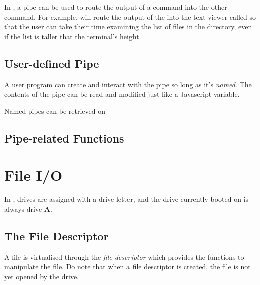 In \thedos, a pipe can be used to route the output of a command into the other command. For example,  will route the output of the  into the text viewer called  so that the user can take their time examining the list of files in the directory, even if the list is taller that the terminal's height.

\section{User-defined Pipe}

A user program can create and interact with the pipe so long as it's \emph{named}. The contents of the pipe can be read and modified just like a Javascript variable.

Named pipes can be retrieved on 

\section{Pipe-related Functions}

\begin{outline}
\1
\1
\1
\1
\1
\1
\end{outline}


\chapter{File I/O}
In \thedos, drives are assigned with a drive letter, and the drive currently booted on is always drive \textbf{A}.


\section{The File Descriptor}
A file is virtualised through the \emph{file descriptor} which provides the functions to manipulate the file. Do note that when a file descriptor is created, the file is not yet opened by the drive.

